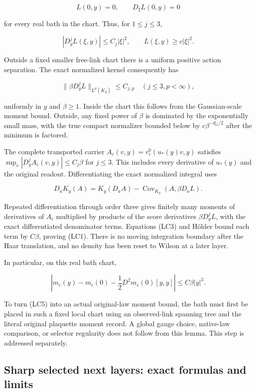 \documentclass[
  11pt,
]{article}
\begin{document}
\[
 L(0,y)=0,\qquad D_\xi L(0,y)=0
\]

for every real bath in the chart. Thus, for \(1\le j\le3\),

\[
 |D_y^jL(\xi,y)|\le C_j|\xi|^2,
 \qquad L(\xi,y)\ge c|\xi|^2.                    \tag{LC2}
\]

Outside a fixed smaller free-link chart there is a uniform positive
action separation. The exact normalized kernel consequently has

\[
 \|\beta D_y^jL\|_{L^p(K_y)}\le C_{j,p}
 \quad (j\le3, p<\infty),                      \tag{LC3}
\]

uniformly in \(y\) and \(\beta\ge1\). Inside the chart this follows from
the Gaussian-scale moment bound. Outside, any fixed power of \(\beta\)
is dominated by the exponentially small mass, with the true compact
normalizer bounded below by \(c\beta^{-d_G/2}\) after the minimum is
factored.

The complete transported carrier \(A_c(v,y)=r_c^0(u_*(y)v,y)\) satisfies
\(\sup_v|D_y^jA_c(v,y)|\le C_j\beta\) for \(j\le3\). This includes every
derivative of \(u_*(y)\) and the original readout. Differentiating the
exact normalized integral uses

\[
 D_a K_y(A)=K_y(D_aA)-\operatorname{Cov}_{K_y}(A,\beta D_aL).
                                                        \tag{LC4}
\]

Repeated differentiation through order three gives finitely many moments
of derivatives of \(A_c\) multiplied by products of the score
derivatives \(\beta D_y^jL\), with the exact differentiated denominator
terms. Equations (LC3) and Hölder bound each term by \(C\beta\), proving
(LC1). There is no moving integration boundary after the Haar
translation, and no density has been reset to Wilson at a later layer.

In particular, on this real bath chart,

\[
 \left|m_c(y)-m_c(0)-\frac12D^2m_c(0)[y,y]\right|
 \le C\beta|y|^3.                               \tag{LC5}
\]

To turn (LC5) into an actual original-law moment bound, the bath must
first be placed in such a fixed local chart using an observed-link
spanning tree and the literal original plaquette moment record. A global
gauge choice, native-law comparison, or selector regularity does not
follow from this lemma. This step is addressed separately.

\hypertarget{sharp-selected-next-layers-exact-formulas-and-limits}{%
\subsection{Sharp selected next layers: exact formulas and
limits}\label{sharp-selected-next-layers-exact-formulas-and-limits}}
\end{document}
